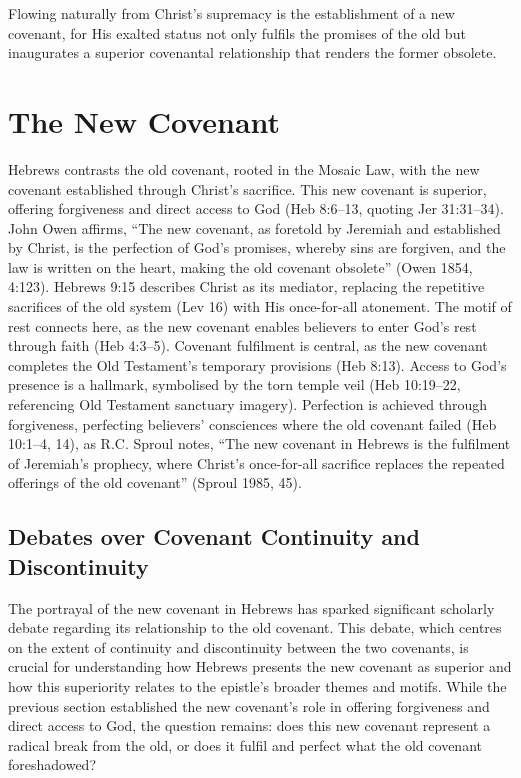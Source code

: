 \documentclass[12pt]{article}
\begin{document}
Flowing naturally from Christ’s supremacy is the establishment of a new
covenant, for His exalted status not only fulfils the promises of the old but
inaugurates a superior covenantal relationship that renders the former obsolete.

\section{The New Covenant}
Hebrews contrasts the old covenant, rooted in the Mosaic Law, with the new
covenant established through Christ’s sacrifice. This new covenant is superior,
offering forgiveness and direct access to God (Heb 8:6--13, quoting Jer
31:31--34). John Owen affirms, ``The new covenant, as foretold by Jeremiah and
established by Christ, is the perfection of God’s promises, whereby sins are
forgiven, and the law is written on the heart, making the old covenant
obsolete'' (Owen 1854, 4:123). Hebrews 9:15 describes Christ as its mediator,
replacing the repetitive sacrifices of the old system (Lev 16) with His
once-for-all atonement. The motif of rest connects here, as the new covenant
enables believers to enter God’s rest through faith (Heb 4:3--5). Covenant
fulfilment is central, as the new covenant completes the Old Testament’s
temporary provisions (Heb 8:13). Access to God’s presence is a hallmark,
symbolised by the torn temple veil (Heb 10:19--22, referencing Old Testament
sanctuary imagery). Perfection is achieved through forgiveness, perfecting
believers’ consciences where the old covenant failed (Heb 10:1--4, 14), as R.C.
Sproul notes, ``The new covenant in Hebrews is the fulfilment of Jeremiah’s
prophecy, where Christ’s once-for-all sacrifice replaces the repeated offerings
of the old covenant'' (Sproul 1985, 45).

\subsection{Debates over Covenant Continuity and Discontinuity}
The portrayal of the new covenant in Hebrews has sparked significant scholarly
debate regarding its relationship to the old covenant. This debate, which
centres on the extent of continuity and discontinuity between the two covenants,
is crucial for understanding how Hebrews presents the new covenant as superior
and how this superiority relates to the epistle’s broader themes and motifs.
While the previous section established the new covenant’s role in offering
forgiveness and direct access to God, the question remains: does this new
covenant represent a radical break from the old, or does it fulfil and perfect
what the old covenant foreshadowed?
\end{document}
